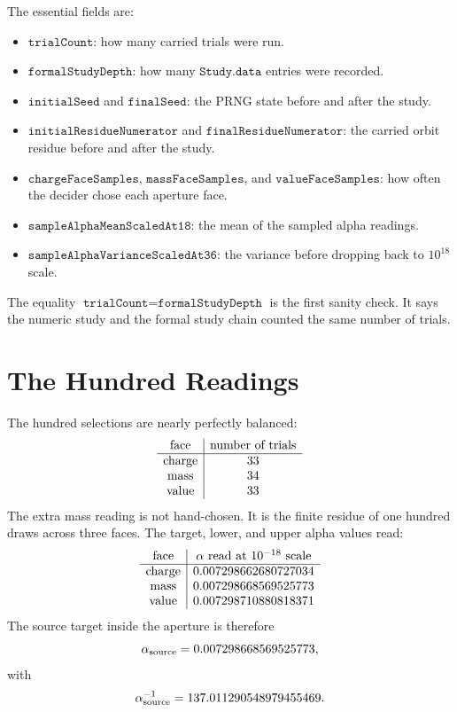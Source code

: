 The essential fields are:
\begin{itemize}
\item \(\texttt{trialCount}\): how many carried trials were run.
\item \(\texttt{formalStudyDepth}\): how many \(\texttt{Study.data}\) entries were recorded.
\item \(\texttt{initialSeed}\) and \(\texttt{finalSeed}\): the PRNG state before and after the study.
\item \(\texttt{initialResidueNumerator}\) and \(\texttt{finalResidueNumerator}\): the carried orbit residue
before and after the study.
\item \(\texttt{chargeFaceSamples}\), \(\texttt{massFaceSamples}\), and \(\texttt{valueFaceSamples}\): how
often the decider chose each aperture face.
\item \(\texttt{sampleAlphaMeanScaledAt18}\): the mean of the sampled alpha readings.
\item \(\texttt{sampleAlphaVarianceScaledAt36}\): the variance before dropping back to \(10^{18}\) scale.
\end{itemize}
The equality \(\texttt{trialCount}=\texttt{formalStudyDepth}\) is the first sanity check. It says the numeric
study and the formal study chain counted the same number of trials.

\section{The Hundred Readings}

The hundred selections are nearly perfectly balanced:
\[
\begin{array}{c|c}
\hbox{face} & \hbox{number of trials}\\
\hline
\hbox{charge} & 33\\
\hbox{mass} & 34\\
\hbox{value} & 33
\end{array}
\]
The extra mass reading is not hand-chosen. It is the finite residue of one hundred draws across three faces.
The target, lower, and upper alpha values read:
\[
\begin{array}{c|c}
\hbox{face} & \alpha\ \hbox{read at }10^{-18}\hbox{ scale}\\
\hline
\hbox{charge} & 0.007298662680727034\\
\hbox{mass} & 0.007298668569525773\\
\hbox{value} & 0.007298710880818371
\end{array}
\]
The source target inside the aperture is therefore
\[
  \alpha_{\rm source}
  =
  0.007298668569525773,
\]
with
\[
  \alpha_{\rm source}^{-1}
  =
  137.011290548979455469.
\]

